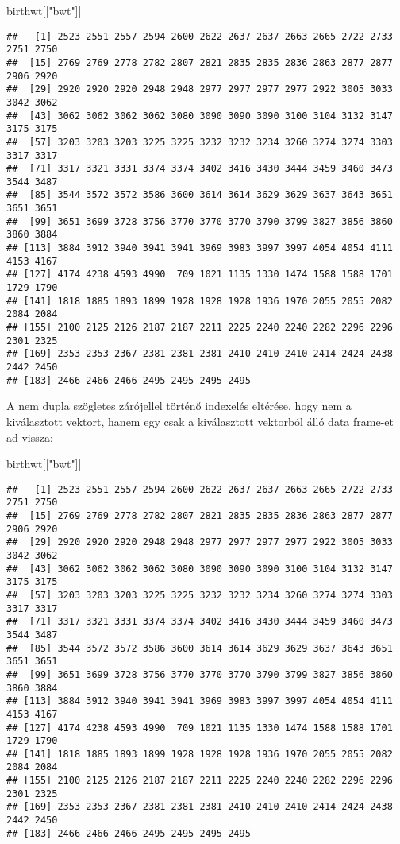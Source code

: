 \documentclass[]{book}
\newenvironment{Shaded}{\begin{snugshade}}{\end{snugshade}}
\newcommand{\NormalTok}[1]{#1}
\newcommand{\StringTok}[1]{\textcolor[rgb]{0.31,0.60,0.02}{#1}}
\begin{document}
\begin{Shaded}
\begin{Highlighting}[]
\NormalTok{birthwt[[}\StringTok{"bwt"}\NormalTok{]]}
\end{Highlighting}
\end{Shaded}

\begin{verbatim}
##   [1] 2523 2551 2557 2594 2600 2622 2637 2637 2663 2665 2722 2733 2751 2750
##  [15] 2769 2769 2778 2782 2807 2821 2835 2835 2836 2863 2877 2877 2906 2920
##  [29] 2920 2920 2920 2948 2948 2977 2977 2977 2977 2922 3005 3033 3042 3062
##  [43] 3062 3062 3062 3062 3080 3090 3090 3090 3100 3104 3132 3147 3175 3175
##  [57] 3203 3203 3203 3225 3225 3232 3232 3234 3260 3274 3274 3303 3317 3317
##  [71] 3317 3321 3331 3374 3374 3402 3416 3430 3444 3459 3460 3473 3544 3487
##  [85] 3544 3572 3572 3586 3600 3614 3614 3629 3629 3637 3643 3651 3651 3651
##  [99] 3651 3699 3728 3756 3770 3770 3770 3790 3799 3827 3856 3860 3860 3884
## [113] 3884 3912 3940 3941 3941 3969 3983 3997 3997 4054 4054 4111 4153 4167
## [127] 4174 4238 4593 4990  709 1021 1135 1330 1474 1588 1588 1701 1729 1790
## [141] 1818 1885 1893 1899 1928 1928 1928 1936 1970 2055 2055 2082 2084 2084
## [155] 2100 2125 2126 2187 2187 2211 2225 2240 2240 2282 2296 2296 2301 2325
## [169] 2353 2353 2367 2381 2381 2381 2410 2410 2410 2414 2424 2438 2442 2450
## [183] 2466 2466 2466 2495 2495 2495 2495
\end{verbatim}

A nem dupla szögletes zárójellel történő indexelés eltérése, hogy nem a kiválasztott vektort, hanem egy csak a kiválasztott vektorból álló data frame-et ad vissza:

\begin{Shaded}
\begin{Highlighting}[]
\NormalTok{birthwt[[}\StringTok{"bwt"}\NormalTok{]]}
\end{Highlighting}
\end{Shaded}

\begin{verbatim}
##   [1] 2523 2551 2557 2594 2600 2622 2637 2637 2663 2665 2722 2733 2751 2750
##  [15] 2769 2769 2778 2782 2807 2821 2835 2835 2836 2863 2877 2877 2906 2920
##  [29] 2920 2920 2920 2948 2948 2977 2977 2977 2977 2922 3005 3033 3042 3062
##  [43] 3062 3062 3062 3062 3080 3090 3090 3090 3100 3104 3132 3147 3175 3175
##  [57] 3203 3203 3203 3225 3225 3232 3232 3234 3260 3274 3274 3303 3317 3317
##  [71] 3317 3321 3331 3374 3374 3402 3416 3430 3444 3459 3460 3473 3544 3487
##  [85] 3544 3572 3572 3586 3600 3614 3614 3629 3629 3637 3643 3651 3651 3651
##  [99] 3651 3699 3728 3756 3770 3770 3770 3790 3799 3827 3856 3860 3860 3884
## [113] 3884 3912 3940 3941 3941 3969 3983 3997 3997 4054 4054 4111 4153 4167
## [127] 4174 4238 4593 4990  709 1021 1135 1330 1474 1588 1588 1701 1729 1790
## [141] 1818 1885 1893 1899 1928 1928 1928 1936 1970 2055 2055 2082 2084 2084
## [155] 2100 2125 2126 2187 2187 2211 2225 2240 2240 2282 2296 2296 2301 2325
## [169] 2353 2353 2367 2381 2381 2381 2410 2410 2410 2414 2424 2438 2442 2450
## [183] 2466 2466 2466 2495 2495 2495 2495
\end{verbatim}
\end{document}
